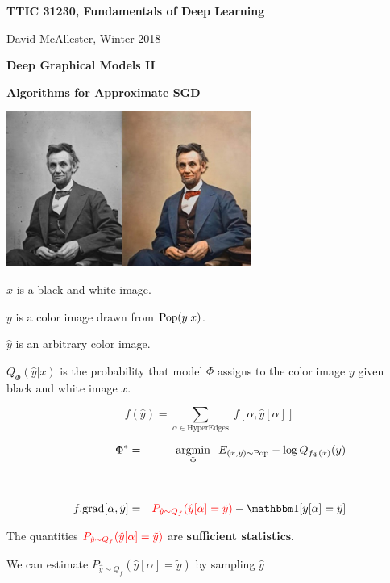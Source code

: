 



{\Huge

  \centerline{\bf TTIC 31230, Fundamentals of Deep Learning}
  \bigskip
  \centerline{David McAllester, Winter 2018}
  \vfill
  \centerline{\bf Deep Graphical Models II}
  \vfill
    \centerline{\bf Algorithms for Approximate SGD}
\vfill



\centerline{\includegraphics[height = 2in]{../images/colorization}}

$x$ is a black and white image.

\vfill
$y$ is a color image drawn from $\mathrm{Pop}(y|x)$.

\vfill
$\hat{y}$ is an arbitrary color image.

\vfill
$Q_\Phi(\hat{y}|x)$ is the probability that model $\Phi$ assigns to the color image $y$ given black and white image $x$.


$$f(\hat{y}) = \sum_{\alpha \in \mathrm{HyperEdges}}  \; f[\alpha,\hat{y}[\alpha]]$$

\begin{eqnarray*}
\Phi^* & = &  \argmin_\Phi \;\;E_{(x,y) \sim \mathrm{Pop}}  -\log Q_{f_\Phi(x)}(y) \\
 \\
 \\
    f.\mathrm{grad}[\alpha,\tilde{y}]
    & = &  {\color{red} P_{\hat{y} \sim Q_f}(\hat{y}[\alpha] = \tilde{y})} - \bbone[y[\alpha] = \tilde{y}] \\
\end{eqnarray*}

\vfill
The quantities ${\color{red} P_{\hat{y} \sim Q_f}(\hat{y}[\alpha] = \tilde{y})}$ are {\bf sufficient statistics}.


We can estimate $P_{\hat{y} \sim Q_f}(\hat{y}[\alpha] = \tilde{y})$ by sampling $\hat{y}$

}
